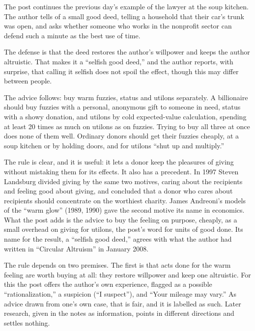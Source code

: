 \begin{afterword}
\summaryhead

The post continues the previous day's example of the lawyer at the soup kitchen. The author tells of a small good deed, telling a household that their car's trunk was open, and asks whether someone who works in the nonprofit sector can defend such a minute as the best use of time.

The defense is that the deed restores the author's willpower and keeps the author altruistic. That makes it a ``selfish good deed,'' and the author reports, with surprise, that calling it selfish does not spoil the effect, though this may differ between people.

The advice follows: buy warm fuzzies, status and utilons separately. A billionaire should buy fuzzies with a personal, anonymous gift to someone in need, status with a showy donation, and utilons by cold expected-value calculation, spending at least 20 times as much on utilons as on fuzzies. Trying to buy all three at once does none of them well. Ordinary donors should get their fuzzies cheaply, at a soup kitchen or by holding doors, and for utilons ``shut up and multiply.''

\responsehead

The rule is clear, and it is useful: it lets a donor keep the pleasures of giving without mistaking them for its effects. It also has a precedent. In 1997 Steven Landsburg divided giving by the same two motives, caring about the recipients and feeling good about giving, and concluded that a donor who cares about recipients should concentrate on the worthiest charity. James Andreoni's models of the ``warm glow'' (1989, 1990) gave the second motive its name in economics. What the post adds is the advice to buy the feeling on purpose, cheaply, as a small overhead on giving for utilons, the post's word for units of good done. Its name for the result, a ``selfish good deed,'' agrees with what the author had written in ``Circular Altruism'' in January 2008.

The rule depends on two premises. The first is that acts done for the warm feeling are worth buying at all: they restore willpower and keep one altruistic. For this the post offers the author's own experience, flagged as a possible ``rationalization,'' a suspicion (``I suspect''), and ``Your mileage may vary.'' As advice drawn from one's own case, that is fair, and it is labelled as such. Later research, given in the notes as information, points in different directions and settles nothing.


\end{afterword}
